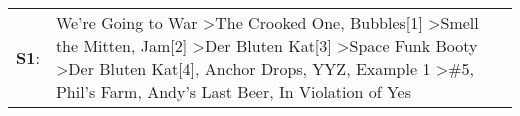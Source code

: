 \begin{supertabular}{p{0.03\textwidth}p{0.92\textwidth}}
 \textbf{S1}:  &  We're Going to War\textsuperscript{} \textgreater \enspace The Crooked One\textsuperscript{}, \enspace Bubbles[1]\textsuperscript{} \textgreater \enspace Smell the Mitten\textsuperscript{}, \enspace Jam[2]\textsuperscript{} \textgreater \enspace Der Bluten Kat[3]\textsuperscript{} \textgreater \enspace Space Funk Booty\textsuperscript{} \textgreater \enspace Der Bluten Kat[4]\textsuperscript{}, \enspace Anchor Drops\textsuperscript{}, \enspace YYZ\textsuperscript{}, \enspace Example 1\textsuperscript{} \textgreater \enspace \#5\textsuperscript{}, \enspace Phil's Farm\textsuperscript{}, \enspace Andy's Last Beer\textsuperscript{}, \enspace In Violation of Yes\textsuperscript{}  \enspace  \\
\end{supertabular}
